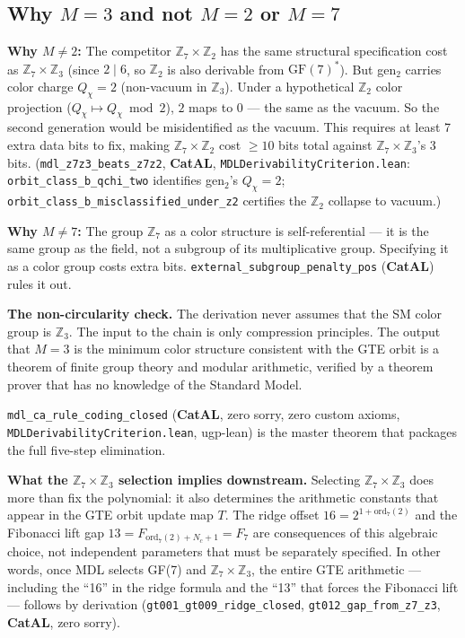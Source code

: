 \documentclass[11pt,a4paper]{article}
\newcommand{\lean}[1]{\texttt{#1}}
\newcommand{\CatAL}{\textbf{CatAL}}
\theoremstyle{definition}
\begin{document}
\subsection{Why \texorpdfstring{$M = 3$}{M=3} and not \texorpdfstring{$M = 2$}{M=2} or \texorpdfstring{$M = 7$}{M=7}}

\textbf{Why $M \neq 2$:}  The competitor $\mathbb{Z}_7 \times \mathbb{Z}_2$
has the same structural specification cost as $\mathbb{Z}_7 \times \mathbb{Z}_3$
(since $2 \mid 6$, so $\mathbb{Z}_2$ is also derivable from $\mathrm{GF}(7)^*$).
But gen$_2$ carries color charge $Q_\chi = 2$ (non-vacuum in $\mathbb{Z}_3$).
Under a hypothetical $\mathbb{Z}_2$ color projection ($Q_\chi \mapsto Q_\chi
\bmod 2$), $2$ maps to $0$ --- the same as the vacuum.  So the second
generation would be misidentified as the vacuum.
This requires at least 7 extra data bits to fix, making $\mathbb{Z}_7 \times
\mathbb{Z}_2$ cost $\geq 10$ bits total against $\mathbb{Z}_7 \times
\mathbb{Z}_3$'s 3 bits.
(\lean{mdl\_z7z3\_beats\_z7z2}, \CatAL, \texttt{MDLDerivabilityCriterion.lean}:
\lean{orbit\_class\_b\_qchi\_two} identifies gen$_2$'s $Q_\chi=2$;
\lean{orbit\_class\_b\_misclassified\_under\_z2} certifies the $\mathbb{Z}_2$
collapse to vacuum.)

\medskip
\textbf{Why $M \neq 7$:}  The group $\mathbb{Z}_7$ as a color structure is
self-referential — it is the same group as the field, not a subgroup of its
multiplicative group.  Specifying it as a color group costs extra bits.
\lean{external\_subgroup\_penalty\_pos} (\CatAL) rules it out.

\medskip
\textbf{The non-circularity check.}  The derivation never assumes that the
SM color group is $\mathbb{Z}_3$.  The input to the chain is only
compression principles.  The output that $M = 3$ is the minimum color
structure consistent with the GTE orbit is a theorem of finite group theory
and modular arithmetic, verified by a theorem prover that has no knowledge
of the Standard Model.

{\sloppy
\lean{mdl\_ca\_rule\_coding\_closed}
(\CatAL, zero sorry, zero custom axioms,
\texttt{MDLDerivabilityCriterion.lean}, ugp-lean)
is the master theorem that packages the full five-step elimination.
\par}

\medskip
\noindent\textbf{What the $\mathbb{Z}_7 \times \mathbb{Z}_3$ selection implies downstream.}\enspace
Selecting $\mathbb{Z}_7 \times \mathbb{Z}_3$ does more than fix the polynomial:
it also determines the arithmetic constants that appear in the GTE orbit update
map $T$.  The ridge offset $16 = 2^{1+\mathrm{ord}_7(2)}$ and the Fibonacci lift
gap $13 = F_{\mathrm{ord}_7(2)+N_c+1} = F_7$ are consequences of this algebraic
choice, not independent parameters that must be separately specified.
In other words, once MDL selects GF(7) and $\mathbb{Z}_7 \times \mathbb{Z}_3$,
the entire GTE arithmetic --- including the ``16'' in the ridge formula and the
``13'' that forces the Fibonacci lift --- follows by derivation
(\lean{gt001\_gt009\_ridge\_closed}, \lean{gt012\_gap\_from\_z7\_z3},
\CatAL, zero sorry).
\end{document}
